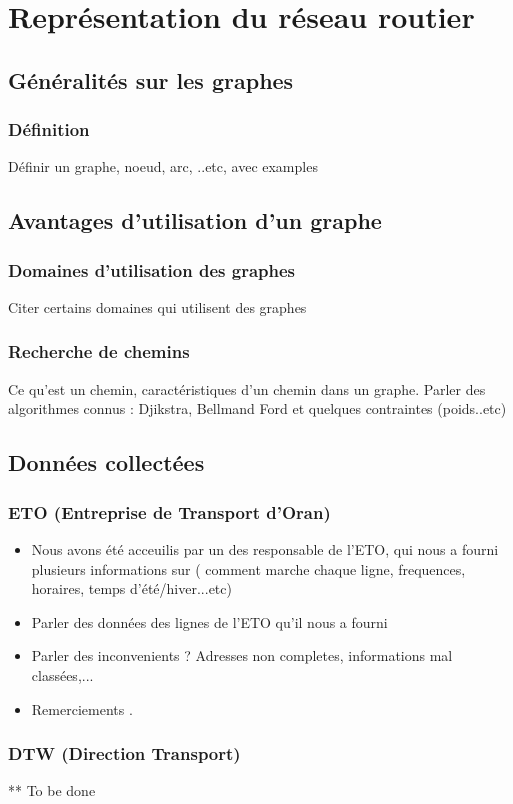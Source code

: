 \chapter{Représentation du réseau routier}
	\section{Généralités sur les graphes}
	\subsection{Définition}
	Définir un graphe, noeud, arc, ..etc, avec examples
	
	\section{Avantages d'utilisation d'un graphe}
	\subsection{Domaines d'utilisation des graphes}
	Citer certains domaines qui utilisent des graphes
	\subsection{Recherche de chemins}
	Ce qu'est un chemin, caractéristiques d'un chemin dans un graphe. Parler des algorithmes connus : Djikstra, Bellmand Ford et quelques contraintes (poids..etc)
	
	\section{Données collectées}
	\subsection{ETO (Entreprise de Transport d'Oran)}
	\begin{itemize}
	\item Nous avons été acceuilis par un des responsable de l'ETO, qui nous a fourni plusieurs informations sur ( comment marche chaque ligne, frequences, horaires, temps d'été/hiver...etc)
	\item Parler des données des lignes de l'ETO qu'il nous a fourni
	\item Parler des inconvenients ? Adresses non completes, informations mal classées,...
	\item Remerciements .
	\end{itemize}
	\subsection{DTW (Direction Transport)}
	** To be done
